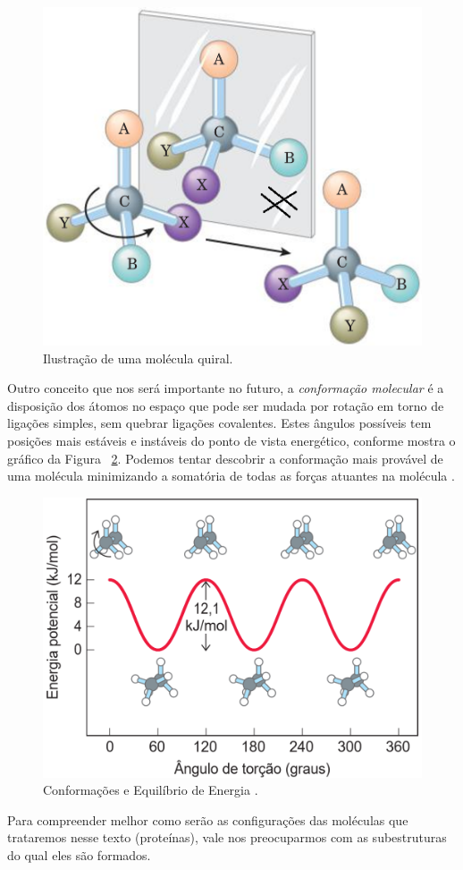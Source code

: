 \begin{figure}[H]
	\begin{center}
		\includegraphics[width=0.45\linewidth]{secProteins/figures/quiral.png}
	\end{center}
	\caption{Ilustração de uma molécula quiral.}
	\label{fig:quiral}
\end{figure} 

Outro conceito que nos será importante no futuro, a \textit{conformação molecular} é a disposição dos átomos no espaço que pode ser mudada por rotação em torno de ligações simples, sem quebrar ligações covalentes. Estes ângulos possíveis tem posições mais estáveis e instáveis do ponto de vista energético, conforme mostra o gráfico da Figura ~\ref{fig:carener}. Podemos tentar descobrir a conformação mais provável de uma molécula minimizando a somatória de todas as forças atuantes na molécula \cite{carlileTese}. 

\begin{figure}[H]
	\begin{center}
		\includegraphics[width=0.55\linewidth]{secProteins/figures/carbonoenergia.png}
	\end{center}
	\caption{Conformações e Equilíbrio de Energia \cite{bioquimicaLehninger}.}
	\label{fig:carener}
\end{figure} 

Para compreender melhor como serão as configurações das moléculas que trataremos nesse texto (proteínas), vale nos preocuparmos com as subestruturas do qual eles são formados. 


